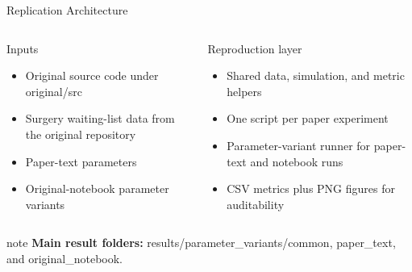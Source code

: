 \documentclass[aspectratio=169,10pt]{beamer}
\newcommand{\code}[1]{{\ttfamily\footnotesize #1}}
\newcommand{\tightitems}{\setlength{\itemsep}{0.25em}\setlength{\parskip}{0pt}\setlength{\parsep}{0pt}}
\begin{document}
\begin{frame}[t]{Replication Architecture}
\footnotesize
\begin{columns}[T,onlytextwidth]
\begin{block}{Inputs}
\begin{itemize}
  \tightitems
  \item Original source code under \code{original/src}
  \item Surgery waiting-list data from the original repository
  \item Paper-text parameters
  \item Original-notebook parameter variants
\end{itemize}
\end{block}

\begin{block}{Reproduction layer}
\begin{itemize}
  \tightitems
  \item Shared data, simulation, and metric helpers
  \item One script per paper experiment
  \item Parameter-variant runner for paper-text and notebook runs
  \item CSV metrics plus PNG figures for auditability
\end{itemize}
\end{block}
\end{columns}

\vfill
\begin{beamercolorbox}[wd=\textwidth,sep=1ex,rounded=true]{note}
\footnotesize
\textbf{Main result folders:}
\code{results/parameter\_variants/common},
\code{paper\_text}, and \code{original\_notebook}.
\end{beamercolorbox}
\end{frame}
\end{document}
